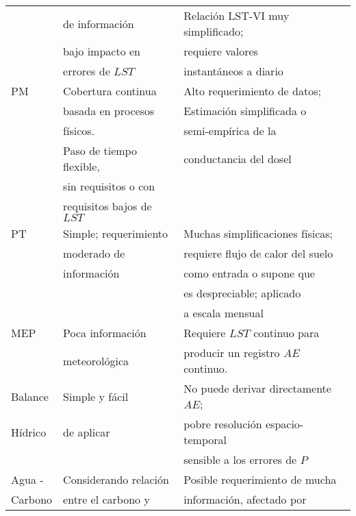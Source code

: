 \begin{longtable}{l|l|l}
                & de información           & Relación LST-VI muy simplificado;   \\
                & bajo impacto en          &   requiere valores                  \\
                & errores de $LST$         & instantáneos a diario     \\ \hline
PM              & Cobertura continua       & Alto requerimiento de datos;          \\
                & basada en procesos       & Estimación simplificada o           \\
                & físicos.                  & semi-empírica de la                 \\
                & Paso de tiempo flexible, & conductancia del dosel              \\
                & sin requisitos o con     &                                     \\
                & requisitos bajos de $LST$  &                                     \\ \hline
PT              & Simple; requerimiento    & Muchas simplificaciones físicas;     \\
                & moderado de              & requiere flujo de calor del suelo   \\
                & información              & como entrada o supone que           \\
                &                          & es despreciable; aplicado             \\ 
                &                          & a escala mensual                    \\ \hline
MEP             & Poca información         & Requiere $LST$ continuo para            \\
                & meteorológica            & producir un registro $AE$ continuo.     \\ \hline
Balance         & Simple y fácil           & No puede derivar directamente $AE$;    \\
Hídrico         & de aplicar               & pobre resolución espacio-temporal   \\
                &                          & sensible a los errores de $P$         \\ \hline
Agua -          & Considerando relación    & Posible requerimiento de mucha      \\
Carbono         & entre el carbono y       & información, afectado por           \\

\end{longtable}
